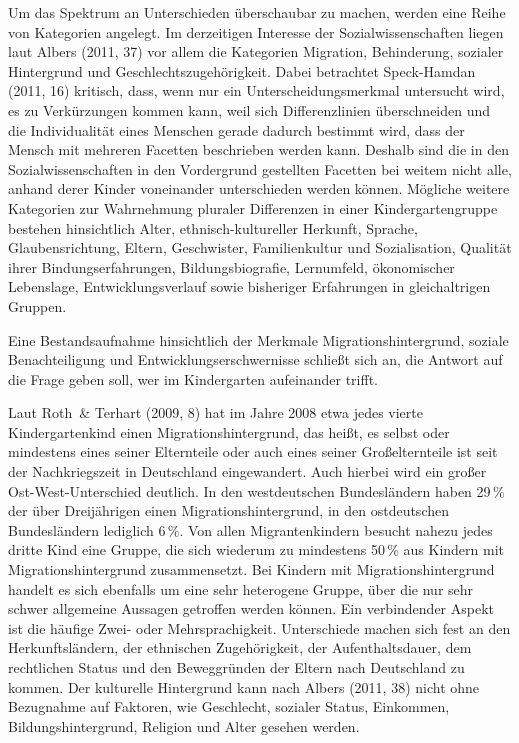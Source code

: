 Um das Spektrum an Unterschieden überschaubar zu machen, werden eine Reihe von Kategorien angelegt. Im derzeitigen Interesse der Sozialwissenschaften liegen laut Albers (2011, 37) vor allem die Kategorien Migration, Behinderung, sozialer Hintergrund und Geschlechtszugehörigkeit.
Dabei betrachtet Speck-Hamdan (2011, 16) kritisch, dass, wenn nur ein Unterscheidungsmerkmal untersucht wird, es zu Verkürzungen kommen kann, weil sich Differenzlinien überschneiden und die Individualität eines Menschen gerade dadurch bestimmt wird, dass der Mensch mit mehreren Facetten beschrieben werden kann. Deshalb sind die in den Sozialwissenschaften in den Vordergrund gestellten Facetten bei weitem nicht alle, anhand derer Kinder voneinander unterschieden werden können. Mögliche weitere Kategorien zur Wahrnehmung pluraler Differenzen in einer Kindergartengruppe bestehen hinsichtlich Alter, ethnisch-kultureller Herkunft, Sprache, Glaubensrichtung, Eltern, Geschwister, Familienkultur und Sozialisation, Qualität ihrer Bindungserfahrungen, Bildungsbiografie, Lernumfeld, ökonomischer Lebenslage, Entwicklungsverlauf sowie bisheriger Erfahrungen in gleichaltrigen Gruppen. 

Eine Bestandsaufnahme hinsichtlich der Merkmale Migrationshintergrund, soziale Benachteiligung und Entwicklungserschwernisse schließt sich an, die Antwort auf die Frage geben soll, wer im Kindergarten aufeinander trifft. 

Laut Roth~\& Terhart (2009, 8) hat im Jahre 2008 etwa jedes vierte Kindergartenkind einen Migrationshintergrund, das heißt, es selbst oder mindestens eines seiner Elternteile oder auch eines seiner Großelternteile ist seit der Nachkriegszeit in Deutschland eingewandert. Auch hierbei wird ein großer Ost-West-Unterschied deutlich. In den westdeutschen Bundesländern haben 29\,\% der über Dreijährigen einen Migrationshintergrund, in den ostdeutschen Bundesländern lediglich 6\,\%. Von allen Migrantenkindern besucht nahezu jedes dritte Kind eine Gruppe, die sich wiederum zu mindestens 50\,\% aus Kindern mit Migrationshintergrund zusammensetzt. Bei Kindern mit Migrationshintergrund handelt es sich ebenfalls um eine sehr heterogene Gruppe, über die nur sehr schwer allgemeine Aussagen getroffen werden können. Ein verbindender Aspekt ist die häufige Zwei- oder Mehrsprachigkeit. Unterschiede machen sich fest an den Herkunftsländern, der ethnischen Zugehörigkeit, der Aufenthaltsdauer, dem rechtlichen Status und den Beweggründen der Eltern nach Deutschland zu kommen. Der kulturelle Hintergrund kann nach Albers (2011, 38) nicht ohne Bezugnahme auf Faktoren, wie Geschlecht, sozialer Status, Einkommen, Bildungshintergrund, Religion und Alter gesehen werden. 
 
